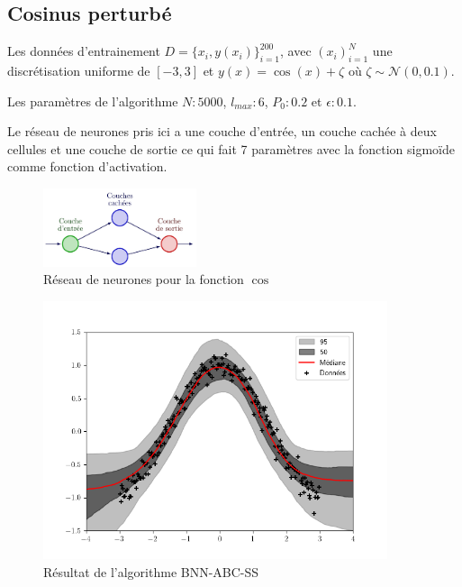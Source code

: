\documentclass[french,12pt]{article}
\begin{document}
\subsection{Cosinus perturbé}

Les données d'entrainement $D = \{x_i , y(x_i)\}_{i = 1}^{200}$, avec $(x_i)_{i = 1}^N$
une discrétisation uniforme de $[-3, 3]$ et $y(x) = \cos(x) + \zeta$ où $\zeta \sim \mathcal{N}(0, 0.1)$.

Les paramètres de l'algorithme $N : 5000$, $l_{max} : 6$, $P_0 : 0.2$ et $\epsilon : 0.1$.

Le réseau de neurones pris ici a une couche d'entrée, un couche cachée à deux cellules et une couche de sortie ce qui
fait 7 paramètres avec la fonction sigmoïde comme fonction d'activation.

\begin{figure}[H]
    \centering
    \includegraphics[width = 0.4\textwidth]{FNN/Images/fnnCos/fnnCos_page-0001.jpg}
    \caption[short]{Réseau de neurones pour la fonction $\cos$}
\end{figure}


\begin{figure}[H]
    \centering
    \includegraphics[width = 0.9\textwidth]{../plots/plotCos-11-04-2023_08-47-51.png}
    \caption[short]{Résultat de l'algorithme BNN-ABC-SS}
\end{figure}
\end{document}
